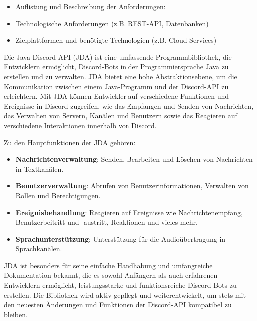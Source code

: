 \begin{itemize}
  \item
        Auflistung und Beschreibung der Anforderungen:
  \item
        Technologische Anforderungen (z.B. REST-API, Datenbanken)
  \item
        Zielplattformen und benötigte Technologien (z.B. Cloud-Services)
\end{itemize}

Die Java Discord API (JDA) ist eine umfassende Programmbibliothek, die Entwicklern ermöglicht, Discord-Bots in der Programmiersprache Java zu erstellen und zu verwalten. JDA bietet eine hohe Abstraktionsebene, um die Kommunikation zwischen einem Java-Programm und der Discord-API zu erleichtern. Mit JDA können Entwickler auf verschiedene Funktionen und Ereignisse in Discord zugreifen, wie das Empfangen und Senden von Nachrichten, das Verwalten von Servern, Kanälen und Benutzern sowie das Reagieren auf verschiedene Interaktionen innerhalb von Discord.
        
        Zu den Hauptfunktionen der JDA gehören:
        \begin{itemize}
            \item \textbf{Nachrichtenverwaltung}: Senden, Bearbeiten und Löschen von Nachrichten in Textkanälen.
            \item \textbf{Benutzerverwaltung}: Abrufen von Benutzerinformationen, Verwalten von Rollen und Berechtigungen.
            \item \textbf{Ereignisbehandlung}: Reagieren auf Ereignisse wie Nachrichtenempfang, Benutzerbeitritt und -austritt, Reaktionen und vieles mehr.
            \item \textbf{Sprachunterstützung}: Unterstützung für die Audioübertragung in Sprachkanälen.
        \end{itemize}
        
        JDA ist besonders für seine einfache Handhabung und umfangreiche Dokumentation bekannt, die es sowohl Anfängern als auch erfahrenen Entwicklern ermöglicht, leistungsstarke und funktionsreiche Discord-Bots zu erstellen. Die Bibliothek wird aktiv gepflegt und weiterentwickelt, um stets mit den neuesten Änderungen und Funktionen der Discord-API kompatibel zu bleiben.